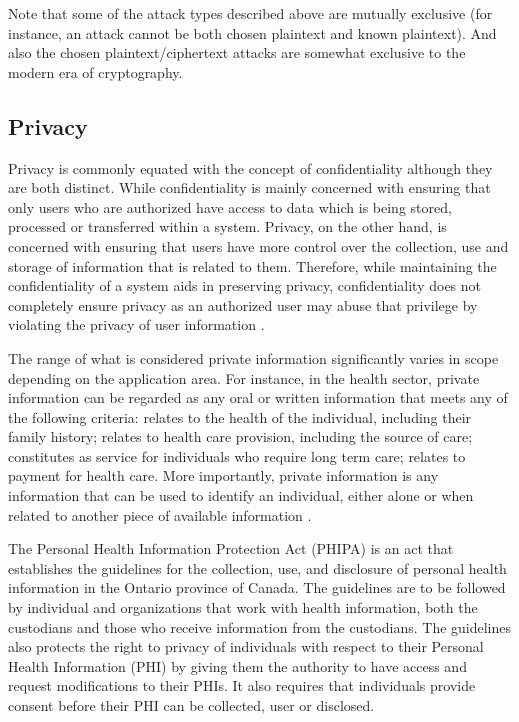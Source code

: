 Note that some of the attack types described above are mutually exclusive (for instance, an attack cannot be both chosen plaintext and known plaintext). And also the chosen plaintext/ciphertext attacks are somewhat exclusive to the modern era of cryptography.

\subsection{Privacy}\label{priv}

Privacy is commonly equated with the concept of confidentiality although they are both distinct. While confidentiality is mainly concerned with ensuring that only users who are authorized have access to data which is being stored, processed or transferred within a system. Privacy, on the other hand, is concerned with ensuring that users have more control over the collection, use and storage of information that is related to them. Therefore, while maintaining the confidentiality of a system aids in preserving privacy, confidentiality does not completely ensure privacy as an authorized user may abuse that privilege by violating the privacy of user information \cite{pearsonprivacy}.

The range of what is considered private information significantly varies in scope depending on the application area. For instance, in the health sector, private information can be regarded as any oral or written information that meets any of the following criteria: relates to the health of the individual, including their family history; relates to health care provision, including the source of care; constitutes as service for individuals who require long term care; relates to payment for health care. More importantly, private information is any information that can be used to identify an individual, either alone or when related to another piece of available information \cite{annpia}.

The Personal Health Information Protection Act (PHIPA) \cite{pihipa} is an act that establishes the guidelines for the collection, use, and disclosure of personal health information in the Ontario province of Canada. The guidelines are to be followed by individual and organizations that work with health information, both the custodians and those who receive information from the custodians. The guidelines also protects the right to privacy of individuals with respect to their Personal Health Information (PHI) by giving them the authority to have access and request modifications to their PHIs. It also requires that individuals provide consent before their PHI can be collected, user or disclosed.

